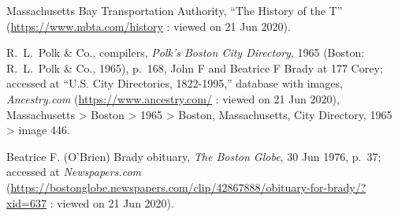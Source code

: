 \begin{thebibliography}{999}
	Massachusetts Bay Transportation Authority, ``The History of the T'' (\url{https://www.mbta.com/history} : viewed on 21 Jun 2020).
	
	R.\ L.\ Polk \& Co., compilers, \textit{Polk's Boston City Directory}, 1965 (Boston: R.\ L.\ Polk \& Co., 1965), p.\ 168, John F and Beatrice F Brady at 177 Corey; accessed at ``U.S. City Directories, 1822-1995,'' database with images, \textit{Ancestry.com} (\url{https://www.ancestry.com/} : viewed on 21 Jun 2020), Massachusetts > Boston > 1965 > Boston, Massachusetts, City Directory, 1965 > image 446.
	
	Beatrice F. (O'Brien) Brady obituary, \textit{The Boston Globe}, 30 Jun 1976, p.\ 37; accessed at \textit{Newspapers.com} (\url{https://bostonglobe.newspapers.com/clip/42867888/obituary-for-brady/?xid=637} : viewed on 21 Jun 2020).

\end{thebibliography}